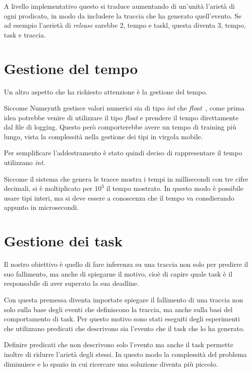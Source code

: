 \myskip

A livello implementativo questo si traduce aumentando di un'unità l'arietà di ogni prodicato, in modo da includere la traccia che ha generato quell'evento. Se ad esempio l'aerietà di \textit{release} sarebbe 2, tempo e taskl, questa diventa 3, tempo, task e traccia.

\section{Gestione del tempo}
Un altro aspetto che ha richiesto attenzione è la gestione del tempo.

Siccome Numsynth gestisce valori numerici sia di tipo \textit{int} che \textit{float}~\cite{numsynth}, come prima idea potrebbe venire di utilizzare il tipo \textit{float} e prendere il tempo direttamente dal file di logging. Questo però comporterebbe avere un tempo di training più lungo, vista la complessità nella gestione dei tipi in virgola mobile.

\myskip

Per semplificare l'addestramento è stato quindi deciso di rappresentare il tempo utilizzano \textit{int}.

Siccome il sistema che genera le tracce mostra i tempi in millisecondi con tre cifre decimali, si è moltiplicato per $10^3$ il tempo mostrato. In questo modo è possibile usare tipi interi, ma si deve essere a conoscenza che il tempo va consdierando appunto in microsecondi.

\section{Gestione dei task}
\label{sec:gestione-task}
Il nostro obiettivo è quello di fare inferenza su una traccia non solo per predirre il suo fallimento, ma anche di spiegarne il motivo, cioè di capire quale task è il responsabile di aver superato la sua deadline.

Con questa premessa diventa importate spiegare il fallimento di una traccia non solo sulla base degli eventi che definiscono la traccia, ma anche sulla basi del comportamento di task. Per questo motivo sono stati eseguiti degli esperimenti che utilizzano predicati che descrivono sia l'evento che il task che lo ha generato.

\myskip

Definire predicati che non descrivono solo l'evento ma anche il task permette inoltre di ridurre l'arietà degli stessi. In questo modo la complessità del problema diminuisce e lo spazio in cui ricercare una soluzione diventa più piccolo.